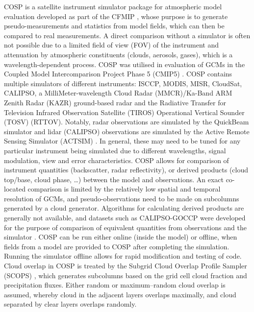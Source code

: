 COSP \citep{bodas-salcedo2011} is a satellite instrument simulator package
for atmospheric model evaluation developed as part of
the CFMIP \citep{bony2011},
whose purpose is to generate pseudo-measurements and statistics from model fields, which can
then be compared to real
measurements. A direct comparison without a simulator is often not possible
due to a limited field of view (FOV) of the instrument and attenuation by atmospheric
constituents (clouds, aerosols, gases), which is a wavelength-dependent process.
COSP was utilised in evaluation of GCMs in the
Coupled Model Intercomparison Project Phase 5 (CMIP5) \citep{taylor2011}.
COSP contains multiple simulators of different instruments:
ISCCP, MODIS, MISR, CloudSat, CALIPSO, a MilliMeter-wavelength Cloud Radar
(MMCR)/Ka-Band ARM Zenith Radar (KAZR) ground-based radar
and the Radiative Transfer for Television Infrared Observation Satellite (TIROS)
Operational Vertical Sounder (TOSV) (RTTOV).
Notably, radar observations are simulated by the QuickBeam simulator
\citep{haynes2007} and lidar (CALIPSO) observations are simulated
by the Active Remote Sensing Simulator (ACTSIM) \citep{chepfer2008}. In general, these may need
to be tuned for any particular instrument being simulated due to different
wavelengths, signal modulation, view and error characteristics.
COSP allows for comparison of instrument quantities
(backscatter, radar reflectivity), or derived products
(cloud top/base, cloud phase, \ldots) between the model and observations.
An exact co-located comparison is limited by the relatively low spatial and
temporal resolution
of GCMs, and pseudo-observations need to be made on subcolumns generated by
a cloud generator. Algorithms for calculating derived products are generally not
available, and datasets such as CALIPSO-GOCCP were developed for the purpose
of comparison of equivalent quantities from observations and the simulator
\citep{chepfer2010}.
COSP can be run either online (inside the model) or offline,
when fields from a model are provided to COSP after completing the simulation.
Running the simulator offline allows for rapid modification
and testing of code. Cloud overlap in COSP is treated by the Subgrid Cloud Overlap Profile Sampler
(SCOPS) \citep{webb2001}, which generates subcolumns based on the grid cell
cloud fraction and precipitation fluxes. Either random or maximum--random cloud overlap
\citep{geleyn1979,ritter1992} is assumed,
whereby cloud in the adjacent layers overlaps maximally, and cloud separated
by clear layers overlaps randomly.

